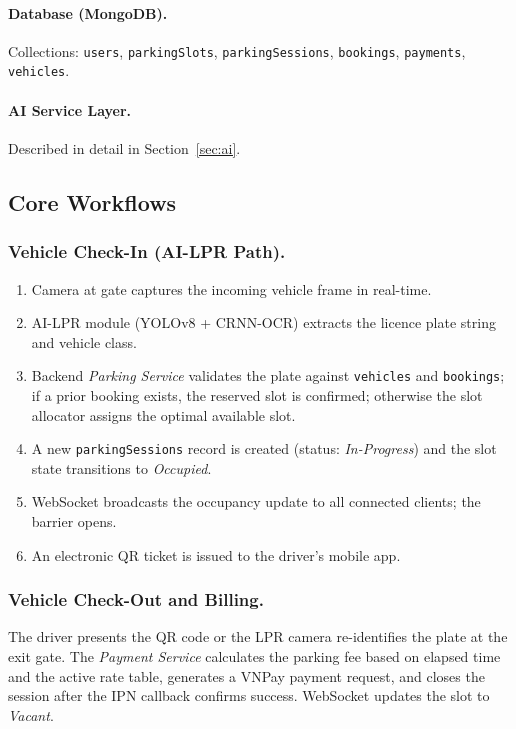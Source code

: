 \documentclass[runningheads]{llncs}
\begin{document}
\paragraph{Database (MongoDB).}
Collections: \texttt{users}, \texttt{parkingSlots},
\texttt{parkingSessions}, \texttt{bookings},
\texttt{payments}, \texttt{vehicles}.

\paragraph{AI Service Layer.}
Described in detail in Section~\ref{sec:ai}.

\subsection{Core Workflows}

\subsubsection{Vehicle Check-In (AI-LPR Path).}

\begin{enumerate}
  \item Camera at gate captures the incoming vehicle
        frame in real-time.
  \item AI-LPR module (YOLOv8 + CRNN-OCR) extracts the
        licence plate string and vehicle class.
  \item Backend \emph{Parking Service} validates the
        plate against \texttt{vehicles} and \texttt{bookings};
        if a prior booking exists, the reserved slot is
        confirmed; otherwise the slot allocator assigns
        the optimal available slot.
  \item A new \texttt{parkingSessions} record is created
        (status: \emph{In-Progress}) and the slot state
        transitions to \emph{Occupied}.
  \item WebSocket broadcasts the occupancy update to all
        connected clients; the barrier opens.
  \item An electronic QR ticket is issued to the driver's
        mobile app.
\end{enumerate}

\subsubsection{Vehicle Check-Out and Billing.}

The driver presents the QR code or the LPR camera
re-identifies the plate at the exit gate. The
\emph{Payment Service} calculates the parking fee based on
elapsed time and the active rate table, generates a VNPay
payment request, and closes the session after the IPN
callback confirms success. WebSocket updates the slot
to \emph{Vacant}.
\end{document}
